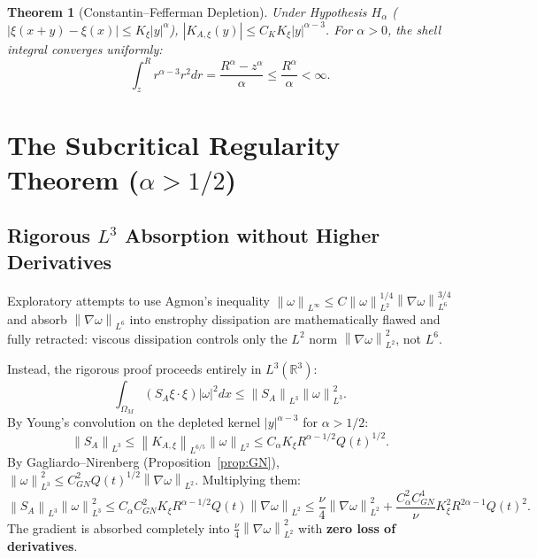 \documentclass[11pt,reqno]{amsart}
\numberwithin{equation}{section}
\newtheorem{theorem}{Theorem}[section]
\theoremstyle{definition}
\newcommand{\R}{\mathbb{R}}
\newcommand{\norm}[1]{\left\lVert#1\right\rVert}
\begin{document}
\begin{theorem}[Constantin--Fefferman Depletion]\label{thm:CF}
Under Hypothesis $H_\alpha$ ($|\xi(x+y) - \xi(x)| \le K_\xi |y|^\alpha$), $|K_{A,\xi}(y)| \le C_K K_\xi |y|^{\alpha - 3}$.
For $\alpha > 0$, the shell integral converges uniformly:
\begin{equation}\label{eq:shell_converge}
\int_z^R r^{\alpha - 3} r^2 dr = \frac{R^\alpha - z^\alpha}{\alpha} \le \frac{R^\alpha}{\alpha} < \infty.
\end{equation}
\end{theorem}

\section{The Subcritical Regularity Theorem ($\alpha > 1/2$)}

\subsection*{Rigorous $L^3$ Absorption without Higher Derivatives}
Exploratory attempts to use Agmon's inequality $\norm{\omega}_{L^\infty} \le C \norm{\omega}_{L^2}^{1/4} \norm{\nabla \omega}_{L^6}^{3/4}$ and absorb $\norm{\nabla \omega}_{L^6}$ into enstrophy dissipation are mathematically flawed and fully retracted: viscous dissipation controls only the $L^2$ norm $\norm{\nabla \omega}_{L^2}^2$, not $L^6$.

Instead, the rigorous proof proceeds entirely in $L^3(\R^3)$:
\begin{equation}\label{eq:L3_bound}
\int_{\Omega_M} (S_A \xi \cdot \xi) |\omega|^2 dx \le \norm{S_A}_{L^3} \norm{\omega}_{L^3}^2.
\end{equation}
By Young's convolution on the depleted kernel $|y|^{\alpha - 3}$ for $\alpha > 1/2$:
\begin{equation}\label{eq:SA_L3}
\norm{S_A}_{L^3} \le \norm{K_{A,\xi}}_{L^{6/5}} \norm{\omega}_{L^2} \le C_\alpha K_\xi R^{\alpha - 1/2} Q(t)^{1/2}.
\end{equation}
By Gagliardo--Nirenberg (Proposition~\ref{prop:GN}), $\norm{\omega}_{L^3}^2 \le C_{GN}^2 Q(t)^{1/2} \norm{\nabla \omega}_{L^2}$. Multiplying them:
\begin{equation}\label{eq:SA_absorb}
\norm{S_A}_{L^3} \norm{\omega}_{L^3}^2 \le C_\alpha C_{GN}^2 K_\xi R^{\alpha - 1/2} Q(t) \norm{\nabla \omega}_{L^2} \le \frac{\nu}{4} \norm{\nabla \omega}_{L^2}^2 + \frac{C_\alpha^2 C_{GN}^4}{\nu} K_\xi^2 R^{2\alpha - 1} Q(t)^2.
\end{equation}
The gradient is absorbed completely into $\frac{\nu}{4} \norm{\nabla \omega}_{L^2}^2$ with \textbf{zero loss of derivatives}.
\end{document}
